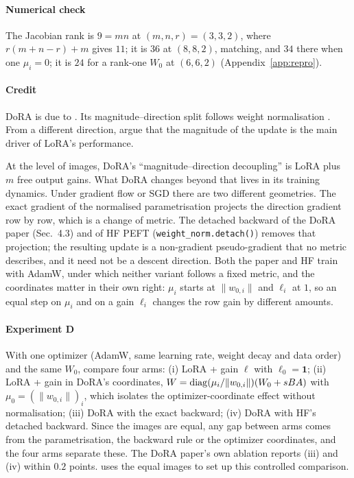 \paragraph{Numerical check}
The Jacobian rank is $9=mn$ at $(m,n,r)=(3,3,2)$, where $r(m+n-r)+m$ gives $11$; it is $36$ at $(8,8,2)$, matching, and
$34$ there when one $\mu_i=0$; it is $24$ for a rank-one $W_0$ at $(6,6,2)$ (Appendix~\ref{app:repro}).

\paragraph{Credit}
DoRA is due to \citet{liu2024dora}. Its magnitude--direction split follows weight normalisation
\citep{salimans2016weight}. From a different direction, \citet{zhang2025primacy} argue that the magnitude of the update
is the main driver of LoRA's performance.

\begin{explains}
At the level of images, DoRA's ``magnitude--direction decoupling'' is LoRA plus $m$ free output gains. What DoRA changes
beyond that lives in its training dynamics. Under gradient flow or SGD there are two different geometries. The exact
gradient of the normalised parametrisation projects the direction gradient row by row, which is a change of metric. The
detached backward of the DoRA paper (Sec.~4.3) and of HF PEFT (\texttt{weight\_norm.detach()}) removes that projection;
the resulting update is a non-gradient pseudo-gradient that no metric describes, and it need not be a descent direction.
Both the paper and HF train with AdamW, under which neither variant follows a fixed metric, and the coordinates matter
in their own right: $\mu_i$ starts at $\lVert w_{0,i}\rVert$ and $\ell_i$ at $1$, so an equal step on $\mu_i$ and on a
gain $\ell_i$ changes the row gain by different amounts.
\end{explains}

\paragraph{Experiment D}
With one optimizer (AdamW, same learning rate, weight decay and data order) and the same $W_0$, compare four arms:
(i) LoRA + gain $\ell$ with $\ell_0=\mathbf 1$; (ii) LoRA + gain in DoRA's coordinates,
$W=\operatorname{diag}(\mu_i/\lVert w_{0,i}\rVert)(W_0+sBA)$ with $\mu_0=(\lVert w_{0,i}\rVert)_i$, which isolates the
optimizer-coordinate effect without normalisation; (iii) DoRA with the exact backward; (iv) DoRA with HF's detached
backward. Since the images are equal, any gap between arms comes from the parametrisation, the backward rule or the
optimizer coordinates, and the four arms separate these. The DoRA paper's own ablation reports (iii) and (iv) within
$0.2$ points.  uses the equal images to set up this controlled comparison.

